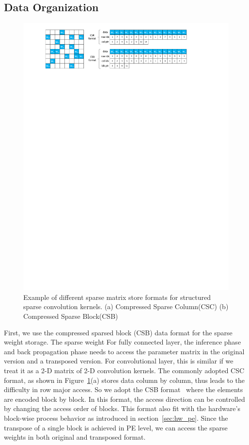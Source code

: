 \subsection{Data Organization}
\begin{figure}[htb]
  \centering
  \includegraphics[width=2.0\columnwidth]{figures/csb_new.pdf}
  \caption{Example of different sparse matrix store formats for structured sparse convolution kernels. (a) Compressed Sparse Column(CSC) (b) Compressed Sparse Block(CSB)}
  \label{fig:csb}
\end{figure}

First, we use the compressed sparsed block (CSB) data format for the sparse weight storage. The sparse weight For fully connected layer, the inference phase and back propagation phase needs to access the parameter matrix in the original version and a transposed version. For convolutional layer, this is similar if we treat it as a 2-D matrix of 2-D convolution kernels. The commonly adopted CSC format, as shown in Figure~\ref{fig:csb}(a) stores data column by column, thus leads to the difficulty in row major access. So we adopt the CSB format~\cite{bulucc2009parallel} where the elements are encoded block by block. In this format, the access direction can be controlled by changing the access order of blocks. This format also fit with the hardware's block-wise process behavior as introduced in section~\ref{sec:hw_pe}. Since the transpose of a single block is achieved in PE level, we can access the sparse weights in both original and transposed format.

